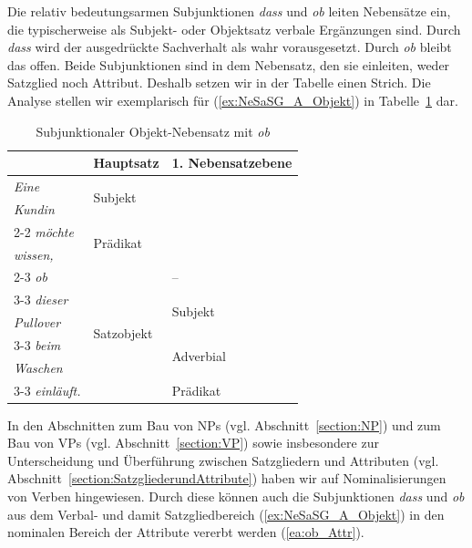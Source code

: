 Die relativ bedeutungsarmen Subjunktionen \textit{dass} und \textit{ob} leiten Nebensätze ein, die typischerweise als Subjekt- oder Objektsatz verbale Ergänzungen sind. Durch \textit{dass} wird der ausgedrückte Sachverhalt als wahr vorausgesetzt. Durch \textit{ob} bleibt das offen. Beide Subjunktionen sind in dem Nebensatz, den sie einleiten, weder Satzglied noch Attribut. Deshalb setzen wir in der Tabelle einen Strich. Die Analyse stellen wir exemplarisch für (\ref{ex:NeSaSG_A_Objekt}) in Tabelle~\ref{tab:Satzgefüge_mit_ob_Objektsatz} dar.

\begin{table}
  \centering
  \begin{tabular}{l|l|l}
      & Hauptsatz & 1. Nebensatzebene \\
    \hline
    \textit{Eine} & \multirow{2}{*}{Subjekt} &  \\
    \textit{Kundin} & & \\ \cline{2-2}
    \textit{möchte} & \multirow{2}{*}{Prädikat} & \\ 
    \textit{wissen,} &  & \\ \cline{2-3}
    \textit{ob} & \multirow{6}{*}{Satzobjekt} & -- \\ \cline{3-3} 
    \textit{dieser} &  & \multirow{2}{*}{Subjekt} \\ 
    \textit{Pullover} & & \\ \cline{3-3} 
    \textit{beim} &  & \multirow{2}{*}{Adverbial} \\
    \textit{Waschen} & & \\ \cline{3-3}
    \textit{einläuft.} & & Prädikat  \\ 
    \hline 
  \end{tabular}
  \caption{Subjunktionaler Objekt-Nebensatz mit \textit{ob}}
  \label{tab:Satzgefüge_mit_ob_Objektsatz}
\end{table}

In den Abschnitten zum Bau von NPs (vgl. Abschnitt~\ref{section:NP}) und zum Bau von VPs (vgl. Abschnitt~\ref{section:VP}) sowie insbesondere zur Unterscheidung und Überführung zwischen Satzgliedern und Attributen (vgl. Abschnitt~\ref{section:SatzgliederundAttribute}) haben wir auf Nominalisierungen von Verben hingewiesen. Durch diese können auch die Subjunktionen \textit{dass} und \textit{ob} aus dem Verbal- und damit Satzgliedbereich (\ref{ex:NeSaSG_A_Objekt}) in den nominalen Bereich der Attribute vererbt werden (\ref{ea:ob_Attr}).

